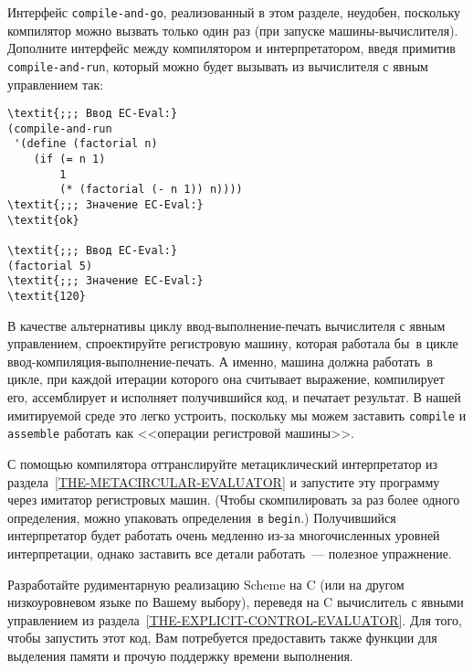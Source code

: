 \begin{exercise}{5.48}%
\label{EX5.48}%
Интерфейс {\tt compile-and-go}, реализованный в
этом разделе, неудобен, поскольку компилятор можно вызвать только один
раз (при запуске машины-вычислителя).  Дополните интерфейс между
компилятором и интерпретатором, введя примитив
{\tt compile-and-run},
который можно будет вызывать из вычислителя с явным управлением так:

\begin{Verbatim}[fontsize=\small]
\textit{;;; Ввод EC-Eval:}
(compile-and-run
 '(define (factorial n)
    (if (= n 1)
        1
        (* (factorial (- n 1)) n))))
\textit{;;; Значение EC-Eval:}
\textit{ok}

\textit{;;; Ввод EC-Eval:}
(factorial 5)
\textit{;;; Значение EC-Eval:}
\textit{120}
\end{Verbatim}
\end{exercise}
\begin{exercise}{5.49}%
\label{EX5.49}%
В качестве альтернативы циклу ввод-выполнение-печать
вычислителя с явным уп\-рав\-ле\-ни\-ем, спроектируйте регистровую машину,
которая работала бы~в цикле ввод-ком\-пи\-ля\-ция-выполнение-печать.
А именно, машина должна работать~в цикле, при каждой итерации которого
она считывает выражение, компилирует его, ассемблирует и исполняет
получившийся код, и печатает результат.  В нашей имитируемой среде это
легко устроить, поскольку мы можем заставить {\tt compile} и
{\tt assemble} работать как <<операции регистровой машины>>.
\end{exercise}
\begin{exercise}{5.50}%
\label{EX5.50}%
%
С помощью компилятора оттранслируйте метациклический
интерпретатор из раздела~\ref{THE-METACIRCULAR-EVALUATOR}
и запустите эту программу через имитатор регистровых машин.  (Чтобы
скомпилировать за раз более одного определения, можно упаковать
определения~в {\tt begin}.)  Получившийся интерпретатор будет
работать очень медленно из-за многочисленных уровней интерпретации,
однако заставить все детали работать~--- полезное упражнение.
\end{exercise}
\begin{exercise}{5.51}%
\label{EX5.51}%
Разработайте 
рудиментарную  реализацию Scheme на C (или  
на другом низкоуровневом языке по Вашему выбору), переведя на C
вычислитель с явными управлением из 
раздела~\ref{THE-EXPLICIT-CONTROL-EVALUATOR}.  Для того, чтобы
запустить этот код, Вам потребуется предоставить также функции для
выделения памяти и прочую поддержку времени выполнения.
\end{exercise}
